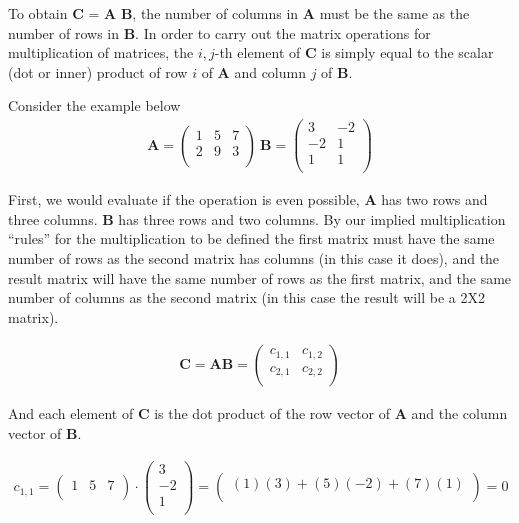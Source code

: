To obtain $\mathbf{C}$ = $\mathbf{A}$ $\mathbf{B}$, the number of columns in $\mathbf{A}$ must be the same as the number of rows in $\mathbf{B}$.  In order to carry out the matrix operations for multiplication of matrices, the $i,j$-th element of  $\mathbf{C}$ is simply equal to the scalar (dot or inner) product of row $i$ of $\mathbf{A}$ and column $j$ of $\mathbf{B}$.

Consider the example below
\begin{gather}
\mathbf{A}=
\begin{pmatrix}
1 & 5 & 7 \\
2 & 9 & 3 \\
\end{pmatrix}
~ 
\mathbf{B}=
\begin{pmatrix}
3 & -2  \\
-2 & 1 \\
1 & 1 \\
\end{pmatrix}
\end{gather}

First, we would evaluate if the operation is even possible, $\mathbf{A}$ has two rows and three columns.  
$\mathbf{B}$ has three rows and two columns.  
By our implied multiplication ``rules'' for the multiplication to be defined the first matrix must have the same number of rows as the second matrix has columns (in this case it does), and the result matrix will have the same number of rows as the first matrix, and the same number of columns as the second matrix (in this case the result will be a 2X2 matrix).

\begin{gather}
\mathbf{C}=\mathbf{A}\mathbf{B}=
\begin{pmatrix}
c_{1,1} & c_{1,2} \\
c_{2,1} & c_{2,2} \\
\end{pmatrix}
\end{gather}

And each element of $\mathbf{C}$ is the dot product of the row vector of $\mathbf{A}$ and the column vector of $\mathbf{B}$.
\newpage

\begin{gather}
c_{1,1} =
\begin{pmatrix}
1 & 5 & 7 \\
\end{pmatrix}
\cdot
\begin{pmatrix}
3 \\
-2 \\
1 \\
\end{pmatrix}
=
\begin{pmatrix}
(1)(3) +(5)(-2) + (7)(1)\\
\end{pmatrix}
= 0
\end{gather}

